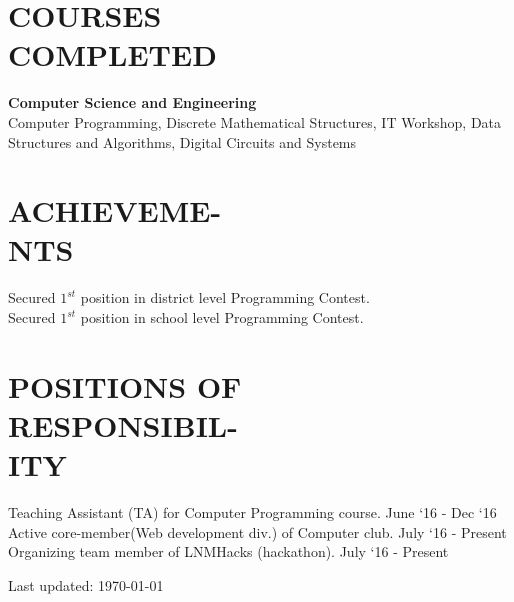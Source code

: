 \documentclass[margin]{res}
\begin{document}
\begin{resume}
\section{COURSES \\ COMPLETED} {\textbf{Computer Science and Engineering}}\\
Computer Programming, Discrete Mathematical Structures, IT Workshop, Data Structures and Algorithms, Digital Circuits and Systems\\

\section{ACHIEVEME-\\NTS}
    Secured $1^{st}$ position in district level Programming Contest.\\
    Secured $1^{st}$ position in school level Programming Contest.\\

\section{POSITIONS OF\\ RESPONSIBIL-\\ITY}
    Teaching Assistant (TA) for Computer Programming course. \hfill June `16 - Dec `16\\
    Active core-member(Web development div.) of Computer club. \hfill July `16 - Present\\
    Organizing team member of LNMHacks (hackathon). \hfill July `16 - Present\\


\begin{center}
  \begin{footnotesize}
    Last updated: \today \\
  \end{footnotesize}
\end{center}

\end{resume}
\end{document}
